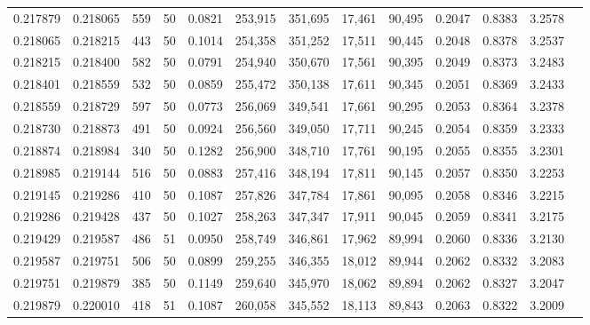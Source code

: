 \begin{tabular}{rrrrrrrrrrrrr}
0.217879 & 0.218065 &   559 &  50 &                                     0.0821 & 253,915 & 351,695 &  17,461 &  90,495 & 0.2047 & 0.8383 & 3.2578 \\
0.218065 & 0.218215 &   443 &  50 &                                     0.1014 & 254,358 & 351,252 &  17,511 &  90,445 & 0.2048 & 0.8378 & 3.2537 \\
0.218215 & 0.218400 &   582 &  50 &                                     0.0791 & 254,940 & 350,670 &  17,561 &  90,395 & 0.2049 & 0.8373 & 3.2483 \\
0.218401 & 0.218559 &   532 &  50 &                                     0.0859 & 255,472 & 350,138 &  17,611 &  90,345 & 0.2051 & 0.8369 & 3.2433 \\
0.218559 & 0.218729 &   597 &  50 &                                     0.0773 & 256,069 & 349,541 &  17,661 &  90,295 & 0.2053 & 0.8364 & 3.2378 \\
0.218730 & 0.218873 &   491 &  50 &                                     0.0924 & 256,560 & 349,050 &  17,711 &  90,245 & 0.2054 & 0.8359 & 3.2333 \\
0.218874 & 0.218984 &   340 &  50 &                                     0.1282 & 256,900 & 348,710 &  17,761 &  90,195 & 0.2055 & 0.8355 & 3.2301 \\
0.218985 & 0.219144 &   516 &  50 &                                     0.0883 & 257,416 & 348,194 &  17,811 &  90,145 & 0.2057 & 0.8350 & 3.2253 \\
0.219145 & 0.219286 &   410 &  50 &                                     0.1087 & 257,826 & 347,784 &  17,861 &  90,095 & 0.2058 & 0.8346 & 3.2215 \\
0.219286 & 0.219428 &   437 &  50 &                                     0.1027 & 258,263 & 347,347 &  17,911 &  90,045 & 0.2059 & 0.8341 & 3.2175 \\
0.219429 & 0.219587 &   486 &  51 &                                     0.0950 & 258,749 & 346,861 &  17,962 &  89,994 & 0.2060 & 0.8336 & 3.2130 \\
0.219587 & 0.219751 &   506 &  50 &                                     0.0899 & 259,255 & 346,355 &  18,012 &  89,944 & 0.2062 & 0.8332 & 3.2083 \\
0.219751 & 0.219879 &   385 &  50 &                                     0.1149 & 259,640 & 345,970 &  18,062 &  89,894 & 0.2062 & 0.8327 & 3.2047 \\
0.219879 & 0.220010 &   418 &  51 &                                     0.1087 & 260,058 & 345,552 &  18,113 &  89,843 & 0.2063 & 0.8322 & 3.2009 \\

\end{tabular}
